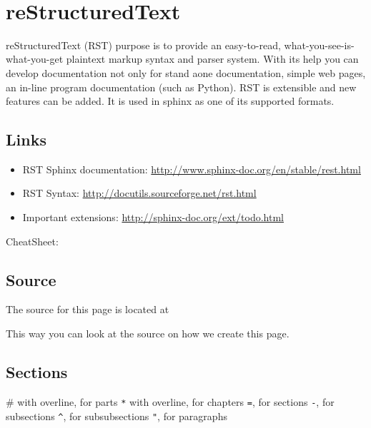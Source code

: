 \FILENAME\

\section{reStructuredText}\label{restructuredtext}

reStructuredText (RST) purpose is to provide an easy-to-read,
what-you-see-is-what-you-get plaintext markup syntax and parser system.
With its help you can develop documentation not only for stand aone
documentation, simple web pages, an in-line program documentation (such
as Python). RST is extensible and new features can be added. It is used
in sphinx as one of its supported formats.

\subsection{Links}\label{links}

\begin{itemize}

\item
  RST Sphinx documentation:
  \url{http://www.sphinx-doc.org/en/stable/rest.html}
\item
  RST Syntax: \url{http://docutils.sourceforge.net/rst.html}
\item
  Important extensions: \url{http://sphinx-doc.org/ext/todo.html}
\end{itemize}

CheatSheet:
\smallskip


\subsection{Source}\label{source}

The source for this page is located at


This way you can look at the source on how we create this page.

\subsection{Sections}\label{sections}

\# with overline, for parts \verb|*| with overline, for chapters \verb|=|, for
sections \verb|-|, for subsections \verb|^|, for subsubsections \verb|"|, for paragraphs

